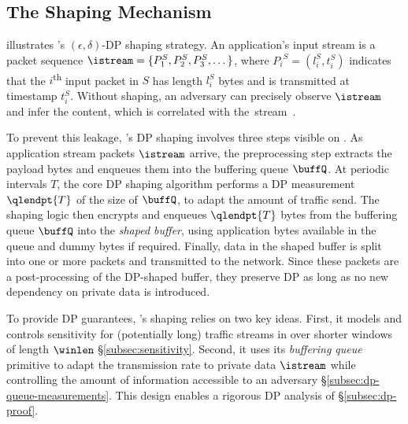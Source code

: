 \subsection{The Shaping Mechanism}
\label{subsec:infromation-bottleneck}

 illustrates {\sys}'s $(\epsilon,\delta)$-DP
shaping strategy.
An application's input stream is a packet sequence
$\istream = \{{P^S_1}, {P^S_2}, {P^S_3}, \dots \}$,
where ${P_i}^S = (l^S_i, t^S_i)$ indicates that the $i$\textsuperscript{th} input
packet in $S$ has length $l^S_i$ bytes and is transmitted at timestamp $t^S_i$.
Without shaping, an adversary can precisely observe $\istream$ and infer
the content,
which is correlated with the~stream~\cite{schuster2017beautyburst}.

To prevent this leakage, \sys's DP shaping involves three steps visible on
.
 As application stream packets $\istream$ arrive, the preprocessing
step extracts the payload bytes and enqueues them into the buffering queue $\buffQ$.
 At periodic intervals $T$, the core DP shaping algorithm
performs a DP measurement $\qlendpt{T}$ of the size of $\buffQ$, to adapt the
amount of traffic send.
The shaping logic then encrypts and enqueues $\qlendpt{T}$ bytes from the
buffering queue $\buffQ$ into the {\em shaped buffer}, using application bytes
available in the queue and dummy bytes if required.
 Finally, data in the shaped buffer is split into one or more packets
and transmitted to the network. Since these packets are a post-processing of the
DP-shaped buffer, they preserve DP as long as no new dependency on private data
is introduced.

To provide DP guarantees, \sys's shaping relies on two key ideas.
First, it models and controls sensitivity for (potentially long) traffic streams
in over shorter windows of length $\winlen$ \S\ref{subsec:sensitivity}.
Second, it uses its {\em buffering queue} primitive to adapt the transmission
rate to private data $\istream$ while controlling the amount of information
accessible to an adversary \S\ref{subsec:dp-queue-measurements}.
This design enables a rigorous DP analysis of {\sys} \S\ref{subsec:dp-proof}.

